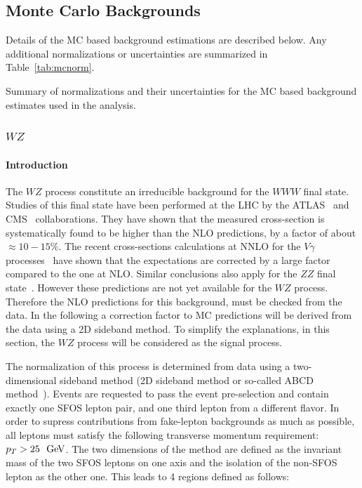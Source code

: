 \subsection{Monte Carlo Backgrounds}
\label{sec:mcbg}

Details of the MC based background estimations are described below.
Any additional normalizations or uncertainties are summarized
in Table~\ref{tab:mcnorm}.

\begin{table}[htp]
\centering

\caption{Summary of normalizations and their uncertainties for the
MC based background estimates used in the analysis.}
\label{tab:mcnorm}
\end{table}



\subsubsection{$WZ$}
\label{sec:wzbg}

\paragraph{Introduction}
The $WZ$ process constitute an irreducible background for the $WWW$ final state. Studies of this final state have been performed at the LHC by the ATLAS~\cite{Aad:2012twa,Anger:1663539} and CMS~\cite{CMS-PAS-SMP-12-006} collaborations. They have shown that the measured cross-section is systematically found to be higher than the NLO predictions, by a factor of about $\approx{}10-15\%$. The recent cross-sections calculations at NNLO for the $V\gamma$ processes~\cite{Grazzini:2015nwa} have shown that the expectations are corrected by a large factor compared to the one at NLO. Similar conclusions also apply for the $ZZ$ final state~\cite{Cascioli:2014yka}. However these predictions are not yet available for the $WZ$ process. Therefore the NLO predictions for this background, must be checked from the data. In the following a correction factor to MC predictions will be derived from the data using a 2D sideband method. To simplify the explanations, in this section, the $WZ$ process will be considered as the signal process.

The normalization of this process is determined from data using a two-dimensional sideband method (2D sideband method or so-called ABCD method~\cite{Aad:2013izg}). Events are requested to pass the event pre-selection and contain exactly one SFOS lepton pair, and one third lepton from a different flavor. In order to supress contributions from fake-lepton backgrounds as much as possible, all leptons must satisfy the following transverse momentum requirement: $p_{T}>25~\GeV$. The two dimensions of the method are defined as the invariant mass of the two SFOS leptons on one axis and the isolation of the non-SFOS lepton as the other one. This leads to 4 regions defined as follows:

